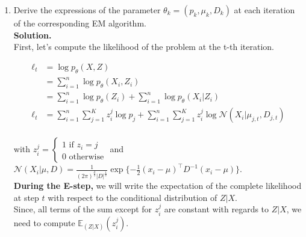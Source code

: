 \documentclass[a4paper, 11pt]{article}
\begin{document}
\begin{enumerate}
    \item Derive the expressions of the parameter $\theta_k = (p_k, \mu_k, D_k)$ at each iteration of the corresponding EM algorithm.
        \vspace{0.3cm} \\
        \textbf{Solution.}\\
        First, let's compute the likelihood of the problem at the t-th iteration. 
        
        \begin{align*}
            \ell_t &= \log p_\theta(X,Z) \\
            &= \sum_{i=1}^{n} \log p_\theta(X_i,Z_i)\\
            &= \sum_{i=1}^{n} \log p_\theta(Z_i) + \sum_{i=1}^{n} \log p_\theta(X_i | Z_i)\\
            \ell_t &= \sum_{i=1}^{n} \sum_{j=1}^{K} z_i^j \log p_j + \sum_{i=1}^{n} \sum_{j=1}^{K} z_i^j \log \mathcal{N}(X_i | \mu_{j,t}, D_{j,t})\\
        \end{align*}
    
    with $z_i^j = \left\{
                        \begin{array}{ll}
                            1 \mbox{ if } z_i = j \\
                            0 \mbox{ otherwise}
                        \end{array}
                    \right.$ 
    and $\mathcal{N}(X_i | \mu, D) = \frac{1}{(2 \pi)^{\frac{d}{2}}|D|^{\frac{1}{2}}} \exp{\{-\frac{1}{2}(x_i - \mu)^\top D^{-1}(x_i-\mu)\}}$. \\
    
    \textbf{During the E-step,} we will write the expectation of the complete likelihood at step $t$ with respect to the conditional distribution of $Z | X$. \\
    Since, all terms of the sum except for $z_i^j$ are constant with regards to $Z | X$, we need to compute $\mathbb{E}_{(Z |X)}(z_i^j)$.
    

\end{enumerate}
\end{document}

